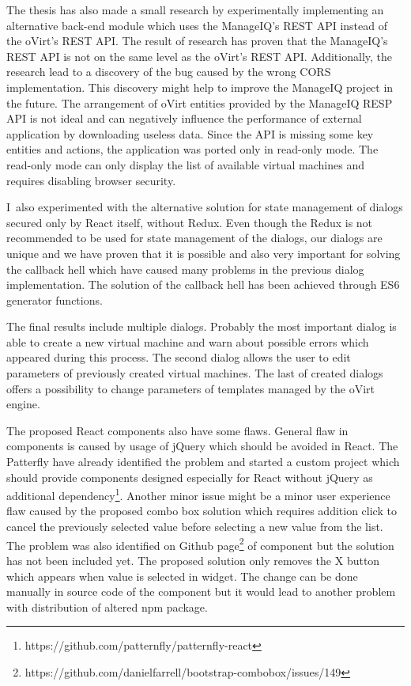 The thesis has also made a small research by experimentally implementing an alternative back-end module which uses the ManageIQ's REST API instead of the oVirt's REST API. The result of research has proven that the ManageIQ's REST API is not on the same level as the oVirt's REST API. Additionally, the research lead to a discovery of the bug caused by the wrong CORS implementation. This discovery might help to improve the ManageIQ project in the future. The arrangement of oVirt entities provided by the ManageIQ RESP API is not ideal and can negatively influence the performance of external application by downloading useless data. Since the API is missing some key entities and actions, the application was ported only in read-only mode. The read-only mode can only display the list of available virtual machines and requires disabling browser security.

I~also experimented with the alternative solution for state management of dialogs secured only by React itself, without Redux. Even though the Redux is not recommended to be used for state management of the dialogs, our dialogs are unique and we have proven that it is possible and also very important for solving the callback hell which have caused many problems in the previous dialog implementation. The solution of the callback hell has been achieved through ES6 generator functions.

The final results include multiple dialogs. Probably the most important dialog is able to create a new virtual machine and warn about possible errors which appeared during this process. The second dialog allows the user to edit parameters of previously created virtual machines. The last of created dialogs offers a possibility to change parameters of templates managed by the oVirt engine.

The proposed React components also have some flaws. General flaw in components is caused by usage of jQuery which should be avoided in React. The Patterfly have already identified the problem and started a custom project which should provide components designed especially for React without jQuery as additional dependency\footnote{https://github.com/patternfly/patternfly-react}. Another minor issue might be a minor user experience flaw caused by the proposed combo box solution which requires addition click to cancel the previously selected value before selecting a new value from the list. The problem was also identified on Github page\footnote{https://github.com/danielfarrell/bootstrap-combobox/issues/149 } of component but the solution has not been included yet. The proposed solution only removes the X button which appears when value is selected in widget. The change can be done manually in source code of the component but it would lead to another problem with distribution of altered npm package.

